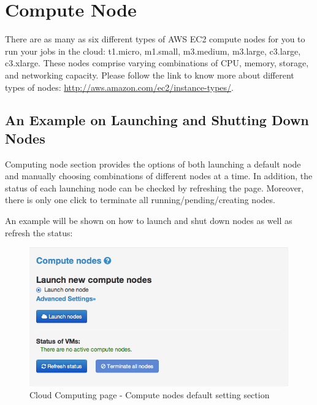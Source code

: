 \section{Compute Node}
There are as many as six different types of AWS EC2 compute nodes for you to run your jobs in the cloud: t1.micro, m1.small, m3.medium, m3.large, c3.large, c3.xlarge. These nodes comprise varying combinations of CPU, memory, storage, and networking capacity. Please follow the link to know more about different types of nodes: \url{http://aws.amazon.com/ec2/instance-types/}.
%

\subsection{An Example on Launching and Shutting Down Nodes}
Computing node section provides the options of both launching a default node and manually choosing combinations of different nodes at a time. In addition, the status of each launching node can be checked by refreshing the page. Moreover, there is only one click to terminate all running/pending/creating nodes.

An example will be shown on how to launch and shut down nodes as well as refresh the status:

\begin{figure}[!ht]
\centering
\includegraphics[scale=0.45]{T6/T6_fig_computenode1.png}
\caption{Cloud Computing page - Compute nodes default setting section}
\label{fig:2}
\end{figure}

